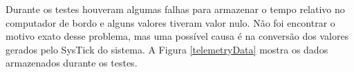 \newpage
Durante os testes houveram algumas falhas para armazenar o tempo relativo no computador de bordo e alguns valores tiveram valor nulo. Não foi encontrar o motivo exato desse problema, mas uma possível causa é na conversão dos valores gerados pelo SysTick do sistema. A Figura \ref{telemetryData} mostra os dados armazenados durante os testes. 


